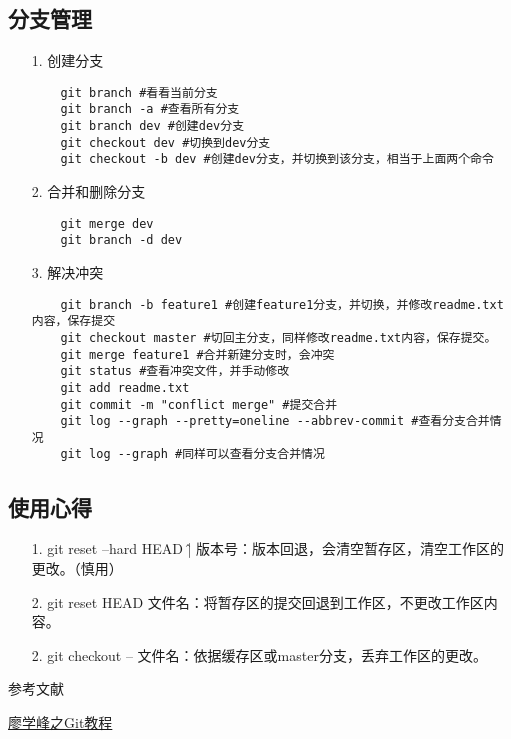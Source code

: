 \documentclass[a4paper,left=1.5cm,right=1.5cm,11pt]{article}
\def\hang{\hangindent\parindent}
\def\textindent#1{\indent\llap{#1\enspace}\ignorespaces}
\def\re{\par\hang\textindent}
\begin{document}
\subsection{分支管理}
\begin{itemize}
	\item[1.]创建分支
	\begin{lstlisting}
	git branch #看看当前分支
	git branch -a #查看所有分支
	git branch dev #创建dev分支
	git checkout dev #切换到dev分支
	git checkout -b dev #创建dev分支，并切换到该分支，相当于上面两个命令
	\end{lstlisting}
	\item[2.]合并和删除分支
	\begin{lstlisting}
	git merge dev
	git branch -d dev
	\end{lstlisting}
	\item[3.]解决冲突
	\begin{lstlisting}
	git branch -b feature1 #创建feature1分支，并切换，并修改readme.txt内容，保存提交
	git checkout master #切回主分支，同样修改readme.txt内容，保存提交。
	git merge feature1 #合并新建分支时，会冲突
	git status #查看冲突文件，并手动修改
	git add readme.txt 
	git commit -m "conflict merge" #提交合并
	git log --graph --pretty=oneline --abbrev-commit #查看分支合并情况
	git log --graph #同样可以查看分支合并情况
	\end{lstlisting}
\end{itemize}
\subsection{使用心得}
\begin{itemize}
	\item[1.]git reset --hard HEAD \^ | 版本号：版本回退，会清空暂存区，清空工作区的更改。（慎用）
	\item[2.]git reset HEAD 文件名：将暂存区的提交回退到工作区，不更改工作区内容。
	\item[2.]git checkout -- 文件名：依据缓存区或master分支，丢弃工作区的更改。
\end{itemize}
\clearpage
\begin{center}
参考文献
\end{center}
\re{[1]} \href{http://www.liaoxuefeng.com/wiki/0013739516305929606dd18361248578c67b8067c8c017b000}{廖学峰之Git教程}  
\end{document}
